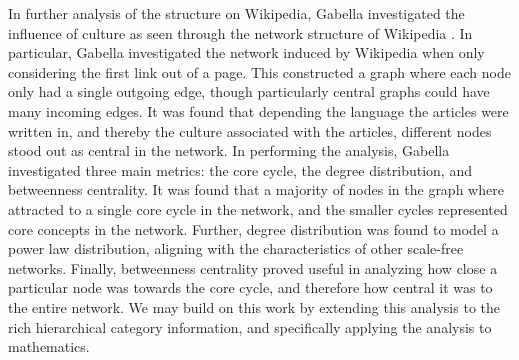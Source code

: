\documentclass[10pt]{paper}
\begin{document}
In further analysis of the structure on Wikipedia, Gabella investigated the influence of culture as seen through the network structure of Wikipedia \cite{gabella2017structures}. In particular, Gabella investigated the network induced by Wikipedia when only considering the first link out of a page. 
This constructed a graph where each node only had a single outgoing edge, though particularly central graphs could have many incoming edges. It was found that depending the language the articles were written in, and thereby the culture associated with the articles, different nodes stood out as central in the network. 
In performing the analysis, Gabella investigated three main metrics: the core cycle, the degree distribution, and betweenness centrality. It was found that a majority of nodes in the graph where attracted to a single core cycle in the network, and the smaller cycles represented core concepts in the network. 
Further, degree distribution was found to model a power law distribution, aligning with the characteristics of other scale-free networks. Finally, betweenness centrality proved useful in analyzing how close a particular node was towards the core cycle, and therefore how central it was to the entire network. 
We may build on this work by extending this analysis to the rich hierarchical category information, and specifically applying the analysis to mathematics. 
\end{document}
